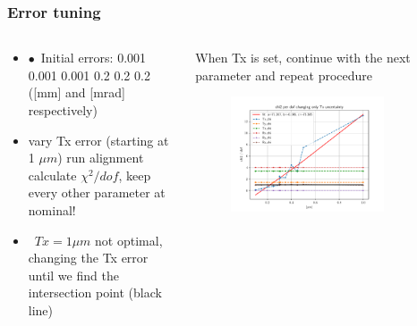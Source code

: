 \documentclass[aspectratio=1610, 12pt]{beamer}
\begin{document}
\begin{frame}\frametitle{Error tuning}
  \begin{columns}
    \begin{column}[c]{0.4\textwidth}
      \begin{itemize}
        \item $\bullet$\, Initial errors: 0.001 0.001 0.001 0.2 0.2 0.2 ([mm] and [mrad] respectively)
        \item vary Tx error (starting at 1 $\mu m$) \to run alignment \to calculate $\chi^2 / dof$, keep every other parameter at nominal!
        \item \to\, $Tx = 1 \mu m$ not optimal, changing the Tx error until we find the intersection point (black line) 
      \end{itemize}
    \end{column}
    \begin{column}[c]{0.6\textwidth}
      When Tx is set, continue with the next parameter and repeat procedure
      \begin{figure}
        \includegraphics[width=0.8\textwidth]{plots/retest/only_Tx_full_fit.pdf}
      \end{figure}
    \end{column}
  \end{columns}
\end{frame}
\end{document}
